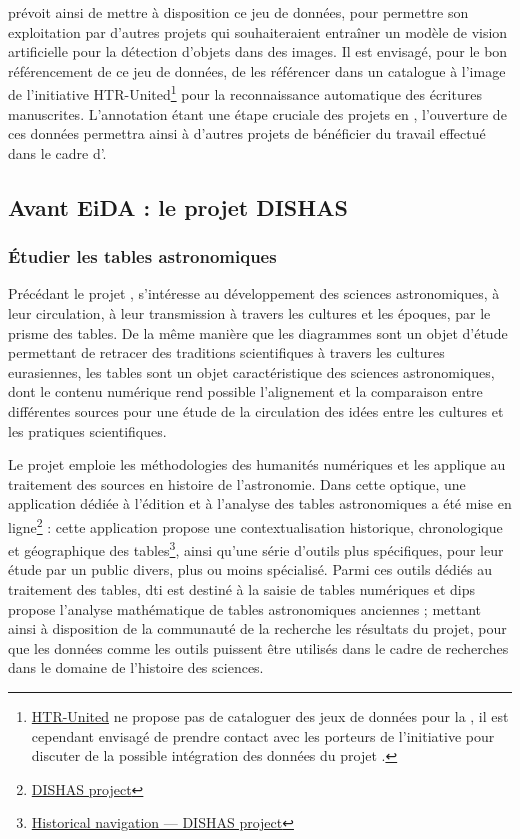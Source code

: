 \eida prévoit ainsi de mettre à disposition ce jeu de données, pour permettre son exploitation par d'autres projets qui souhaiteraient entraîner un modèle de vision artificielle pour la détection d'objets dans des images. Il est envisagé, pour le bon référencement de ce jeu de données, de les référencer dans un catalogue à l'image de l'initiative HTR-United\footnote{\href{https://htr-united.github.io/index.html}{HTR-United} ne propose pas de cataloguer des jeux de données pour la \cv, il est cependant envisagé de prendre contact avec les porteurs de l'initiative pour discuter de la possible intégration des données du projet \eida.} pour la reconnaissance automatique des écritures manuscrites. L'annotation étant une étape cruciale des projets en \ml, l'ouverture de ces données permettra ainsi à d'autres projets de bénéficier du travail effectué dans le cadre d'\eida.

    \subsection{Avant EiDA : le projet DISHAS}
        \subsubsection{Étudier les tables astronomiques}
Précédant le projet \eida, \dishas s’intéresse au développement des sciences astronomiques, à leur circulation, à leur transmission à travers les cultures et les époques, par le prisme des tables. De la même manière que les diagrammes sont un objet d’étude permettant de retracer des traditions scientifiques à travers les cultures eurasiennes, les tables sont un objet caractéristique des sciences astronomiques, dont le contenu numérique rend possible l’alignement et la comparaison entre différentes sources pour une étude de la circulation des idées entre les cultures et les pratiques scientifiques.

Le projet \dishas emploie les méthodologies des humanités numériques et les applique au traitement des sources en histoire de l’astronomie. Dans cette optique, une application dédiée à l’édition et à l’analyse des tables astronomiques a été mise en ligne\footnote{\href{https://dishas.obspm.fr/}{DISHAS project}} : cette application propose une contextualisation historique, chronologique et géographique des tables\footnote{\href{https://dishas.obspm.fr/historical-navigation}{Historical navigation — DISHAS project}}, ainsi qu’une série d’outils plus spécifiques, pour leur étude par un public divers, plus ou moins spécialisé. Parmi ces outils dédiés au traitement des tables, \acrfull{dti} est destiné à la saisie de tables numériques et \acrfull{dips} propose l’analyse mathématique de tables astronomiques anciennes ; mettant ainsi à disposition de la communauté de la recherche les résultats du projet, pour que les données comme les outils puissent être utilisés dans le cadre de recherches dans le domaine de l’histoire des sciences. 

